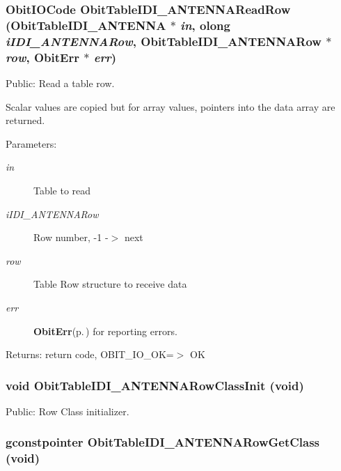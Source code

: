 \subsubsection{\setlength{\rightskip}{0pt plus 5cm}Obit\-IOCode Obit\-Table\-IDI\_\-ANTENNARead\-Row ({\bf Obit\-Table\-IDI\_\-ANTENNA} $\ast$ {\em in}, {\bf olong} {\em i\-IDI\_\-ANTENNARow}, {\bf Obit\-Table\-IDI\_\-ANTENNARow} $\ast$ {\em row}, {\bf Obit\-Err} $\ast$ {\em err})}\label{ObitTableIDI__ANTENNA_8h_a18}


Public: Read a table row. 

Scalar values are copied but for array values, pointers into the data array are returned. \begin{Desc}
\item[Parameters:]
\begin{description}
\item[{\em in}]Table to read \item[{\em i\-IDI\_\-ANTENNARow}]Row number, -1 -$>$ next \item[{\em row}]Table Row structure to receive data \item[{\em err}]{\bf Obit\-Err}{\rm (p.\,\pageref{structObitErr})} for reporting errors. \end{description}
\end{Desc}
\begin{Desc}
\item[Returns:]return code, OBIT\_\-IO\_\-OK=$>$ OK \end{Desc}
\subsubsection{\setlength{\rightskip}{0pt plus 5cm}void Obit\-Table\-IDI\_\-ANTENNARow\-Class\-Init (void)}\label{ObitTableIDI__ANTENNA_8h_a7}


Public: Row Class initializer. 

\subsubsection{\setlength{\rightskip}{0pt plus 5cm}gconstpointer Obit\-Table\-IDI\_\-ANTENNARow\-Get\-Class (void)}\label{ObitTableIDI__ANTENNA_8h_a9}


